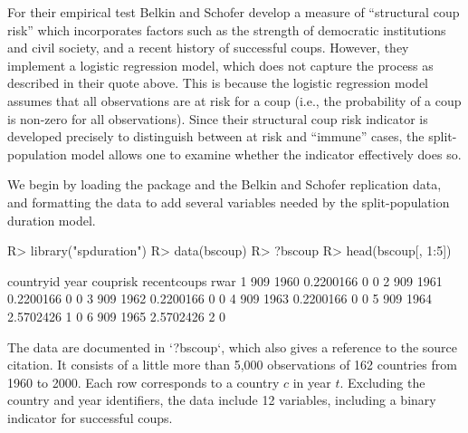 \documentclass[article]{jss}
\begin{document}
For their empirical test Belkin and Schofer develop a measure of
``structural coup risk'' which incorporates factors such as the strength
of democratic institutions and civil society, and a recent history of
successful coups. However, they implement a logistic regression model,
which does not capture the process as described in their quote above.
This is because the logistic regression model assumes that all
observations are at risk for a coup (i.e., the probability of a coup is
non-zero for all observations). Since their structural coup risk
indicator is developed precisely to distinguish between at risk and
``immune'' cases, the split-population model allows one to examine
whether the indicator effectively does so.

We begin by loading the package and the Belkin and Schofer replication
data, and formatting the data to add several variables needed by the
split-population duration model.

\begin{CodeChunk}
\begin{CodeInput}
R> library("spduration")
R> data(bscoup)
R> ?bscoup
R> head(bscoup[, 1:5])
\end{CodeInput}
\begin{CodeOutput}
  countryid year  couprisk recentcoups rwar
1       909 1960 0.2200166           0    0
2       909 1961 0.2200166           0    0
3       909 1962 0.2200166           0    0
4       909 1963 0.2200166           0    0
5       909 1964 2.5702426           1    0
6       909 1965 2.5702426           2    0
\end{CodeOutput}
\end{CodeChunk}

The data are documented in `?bscoup`, which also gives a reference to the source citation. It consists of a little more than 5,000 observations of 162 countries from 1960 to 2000. Each row corresponds to a country $c$ in year $t$. Excluding the country and year identifiers, the data include 12 variables, including a binary indicator for successful coups. 
\end{document}
